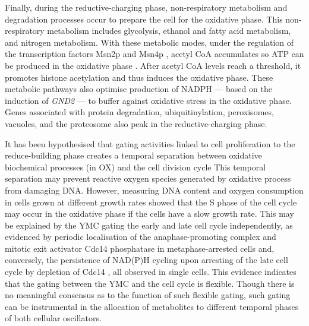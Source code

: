 Finally, during the reductive-charging phase,
non-respiratory metabolism and degradation processes occur to prepare the cell for the oxidative phase.
This non-respiratory metabolism includes glycolysis, ethanol and fatty acid metabolism, and nitrogen metabolism.
With these metabolic modes, under the regulation of the transcription factors Msn2p and Msn4p \citep{kuangMsn2RegulateExpression2017}, acetyl CoA accumulates so ATP can be produced in the oxidative phase \citep{tuLogicYeastMetabolic2005}.
After acetyl CoA levels reach a threshold, it promotes histone acetylation and thus induces the oxidative phase.
These metabolic pathways also optimise production of NADPH --- based on the induction of \emph{GND2} --- to buffer against oxidative stress in the oxidative phase.
Genes associated with protein degradation, ubiquitinylation, peroxisomes, vacuoles, and the proteosome also peak in the reductive-charging phase.

It has been hypothesised that gating activities linked to cell proliferation to the reduce-building phase
creates a temporal separation between oxidative biochemical processes (in OX) and the cell division cycle
This temporal separation may prevent reactive oxygen species generated by oxidative process from damaging DNA.
However, measuring DNA content and oxygen consumption in cells grown at different growth rates \citep{slavovCouplingGrowthRate2011} showed that the S phase of the cell cycle may occur in the oxidative phase if the cells have a slow growth rate.
This may be explained by the YMC gating the early and late cell cycle independently, as evidenced by periodic localisation of the anaphase-promoting complex and mitotic exit activator Cdc14 phosphatase in metaphase-arrested cells \parencite{luPeriodicCyclinCdkActivity2010} and, conversely, the persistence of NAD(P)H cycling upon arresting of the late cell cycle by depletion of Cdc14 \parencite{papagiannakisAutonomousMetabolicOscillations2017}, all observed in single cells.
This evidence indicates that the gating between the YMC and the cell cycle is flexible.
Though there is no meaningful consensus as to the function of such flexible gating,
such gating can be instrumental in the allocation of metabolites to different temporal phases of both cellular oscillators.


